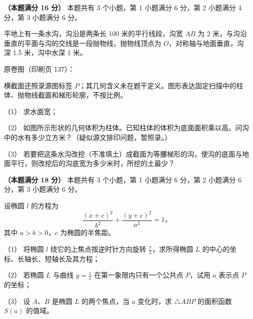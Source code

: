 \begin{question}
\textbf{（本题满分 16 分）} 本题共有 3 个小题，第 1 小题满分 6 分，第 2 小题满分 4 分，第 3 小题满分 6 分。

平地上有一条水沟，沟沿是两条长 100 米的平行线段，沟宽 $AB$ 为 2 米，与沟沿垂直的平面与沟的交线是一段抛物线，抛物线顶点为 $O$，对称轴与地面垂直，沟深 1.5 米，沟中水深 1 米。

原卷图（印刷页 137）：
\nopagebreak[4]
\begin{center}\end{center}
\nopagebreak[4]
\nopagebreak[4]
\begin{center}\end{center}
\nopagebreak[4]
横截面还照录源图标签 $P$；其几何含义未在题干定义。图形表达固定扫描中的柱体、抛物线截面和梯形轮廓，不按比例。

（1） 求水面宽；

（2） 如图所示形状的几何体积为柱体。已知柱体的体积为底面面积乘以高。问沟中的水有多少立方米？（疑似源文排印问题，暂照录。）

（3） 若要把这条水沟改挖（不准填土）成截面为等腰梯形的沟，使沟的底面与地面平行，则改挖后的沟底宽为多少米时，所挖的土最少？

\end{question}
\begin{question}
\textbf{（本题满分 18 分）} 本题共有 3 个小题，第 1 小题满分 6 分，第 2 小题满分 6 分，第 3 小题满分 6 分。

设椭圆 $l$ 的方程为
\nopagebreak[4]
\[
\frac{(x+c)^2}{b^2}+\frac{(y+c)^2}{a^2}=1\mbox{，}
\]
其中 $a>b>0$，$c$ 为椭圆的半焦距。

（1） 将椭圆 $l$ 绕它的上焦点按逆时针方向旋转 $\frac\pi2$，求所得椭圆 $L$ 的中心的坐标、长轴长、短轴长及其方程；

（2） 若椭圆 $L$ 与曲线 $y=\frac1x$ 在第一象限内只有一个公共点 $P$，试用 $a$ 表示点 $P$ 的坐标；

（3） 设 $A\text{、}B$ 是椭圆 $L$ 的两个焦点，当 $a$ 变化时，求 $\triangle ABP$ 的面积函数 $S(a)$ 的值域。

\end{question}